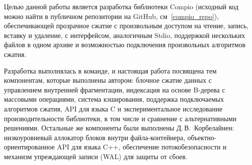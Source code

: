 Целью данной работы является разработка библиотеки Compio (исходный код можно найти в публичном репозитории на GitHub, см~\ref{compio_repo}), обеспечивающей прозрачное сжатие с произвольным доступом на чтение, запись, вставку и удаление, с интерфейсом, аналогичным Stdio, поддержкой нескольких файлов в одном архиве и возможностью подключения произвольных алгоритмов сжатия.

Разработка выполнялась в команде, и настоящая работа посвящена тем компонентам, которые выполнены автором: блочное сжатие данных с управлением внутренней фрагментации, индексация на основе B-дерева с массовыми операциями, система кэширования, поддержка подключаемых алгоритмов сжатия, API для языка C и экспериментальное исследование производительности библиотеки, в том числе и сравнение с альтернативными решениями. Остальные же компоненты были выполнены Д.\,В.~Корбелайнен: низкоуровневый аллокатор блоков внутри файла-контейнера, объектно-ориентированное API для языка C++, обеспечение потокобезопасности и механизм упреждающей записи (WAL) для защиты от сбоев.

